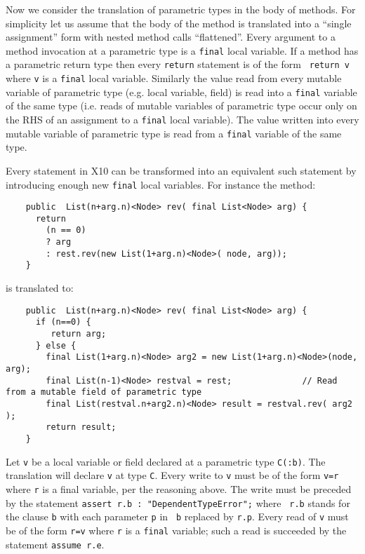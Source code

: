 \documentclass{article}
\def\Xten{{\sf X10}}
\begin{document}
Now we consider the translation of parametric types in the body of
methods.  For simplicity let us assume that the body of the method is
translated into a ``single assignment'' form with nested method calls
``flattened''. Every argument to a method invocation at a parametric
type is a {\tt final} local variable.  If a method has a parametric
return type then every {\tt return} statement is of the form {\tt
return v} where {\tt v} is a {\tt final} local variable.  Similarly
the value read from every mutable variable of parametric type (e.g.{}
local variable, field) is read into a {\tt final} variable of the same
type (i.e.{} reads of mutable variables of parametric type occur only
on the RHS of an assignment to a {\tt final} local variable). The
value written into every mutable variable of parametric type is read
from a {\tt final} variable of the same type. 

Every statement in \Xten{} can be transformed into an equivalent such
statement by introducing enough new {\tt final} local variables. For
instance the method:
{\footnotesize
  \begin{verbatim}
    public  List(n+arg.n)<Node> rev( final List<Node> arg) {
      return 
        (n == 0) 
        ? arg 
        : rest.rev(new List(1+arg.n)<Node>( node, arg));
    }
  \end{verbatim}
}

\noindent is translated to:

{\footnotesize
  \begin{verbatim}
    public  List(n+arg.n)<Node> rev( final List<Node> arg) {
      if (n==0) {
         return arg;
      } else {
        final List(1+arg.n)<Node> arg2 = new List(1+arg.n)<Node>(node, arg);
        final List(n-1)<Node> restval = rest;              // Read from a mutable field of parametric type
        final List(restval.n+arg2.n)<Node> result = restval.rev( arg2 );
        return result;
    }
  \end{verbatim}}

Let {\tt v} be a local variable or field declared at a parametric type
{\tt C(:b)}. The translation will declare {\tt v} at type {\tt C}.
Every write to {\tt v} must be of the form {\tt v=r} where {\tt r} is
a final variable, per the reasoning above. The write must be preceded
by the statement {\tt assert r.b : "DependentTypeError";} where {\tt
r.b} stands for the clause {\tt b} with each parameter {\tt p} in {\tt
b} replaced by {\tt r.p}. Every read of {\tt v} must be of the form
{\tt r=v} where {\tt r} is a {\tt final} variable; such a read is
succeeded by the statement {\tt assume r.e}.
\end{document}
